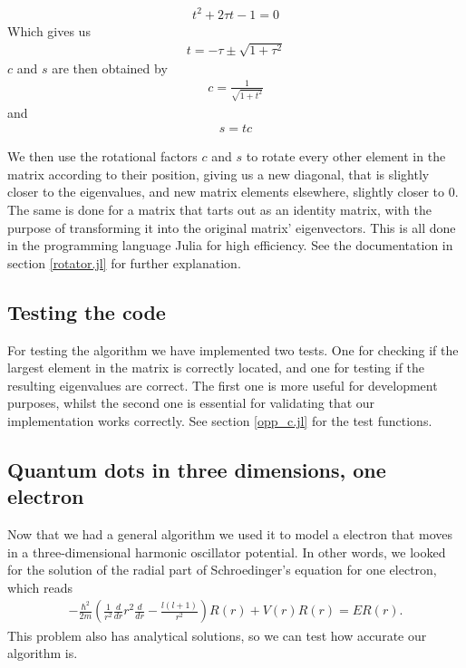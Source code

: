 \documentclass[a4paper]{article}
\begin{document}
\begin{align}
t^2+2\tau t-1=0
\end{align}
Which gives us
\begin{align}
t = -\tau \pm \sqrt{1+\tau^2}
\end{align}
$c$ and $s$ are then obtained by
\begin{align}
c = \frac{1}{\sqrt{1+t^2}}
\end{align}
and
\begin{align}
s=tc
\end{align}  

We then use the rotational factors $c$ and $s$ to rotate every other element in the matrix according to their position, giving us a new diagonal, that is slightly closer to the eigenvalues, and new matrix elements elsewhere, slightly closer to 0. The same is done for a matrix that tarts out as an identity matrix, with the purpose of transforming it into the original matrix' eigenvectors. This is all done in the programming language Julia for high efficiency. See the documentation in section \ref{rotator.jl} for further explanation.

\subsection{Testing the code}

For testing the algorithm we have implemented two tests. One for checking if the largest element in the matrix is correctly located, and one for testing if the resulting eigenvalues are correct. The first one is more useful for development purposes, whilst the second one is essential for validating that our implementation works correctly. See section \ref{opp_c.jl} for the test functions.

\subsection{Quantum dots in three dimensions, one electron}

Now that we had a general algorithm we used it to model a electron that moves in a three-dimensional harmonic oscillator potential. In other words, we looked for the solution of the radial part of Schroedinger’s
equation for one electron, which reads
\begin{align}
- \frac{\hbar^2}{2m} \left( \frac{1}{r^2} \frac{d}{dr} r^2 \frac{d}{dr} - \frac{l(l+1)}{r^2}\right) R(r) + V(r) R(r) = ER(r).
\end{align}
This problem also has analytical solutions, so we can test how accurate our algorithm is.
\end{document}
